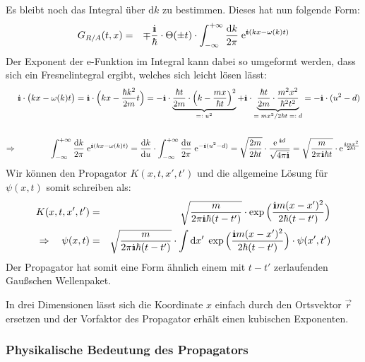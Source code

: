 Es bleibt noch das Integral über $\mathrm{d}k$ zu bestimmen. Dieses hat nun folgende Form: 
\begin{eqnarray*}
	G_{R/A}(t,x) &=& \mp \frac{\I}{\hbar}\cdot\Theta(\pm t)\cdot\int_{-\infty}^{+\infty}\frac{\mathrm{d}k}{2\pi}\; \e^{\I(kx-\omega(k)t)} 
\end{eqnarray*}
Der Exponent der e-Funktion im Integral kann dabei so umgeformt werden, dass sich ein Fresnelintegral ergibt, welches sich leicht lösen lässt: 
\begin{eqnarray} 
	&&\!\!\!\! \I\cdot\big(kx-\omega(k)t\big) = \I\cdot\Big(kx-\frac{\hbar k^2}{2m}t\Big) = -\I\cdot\underbrace{\frac{\hbar t}{2m}\cdot\Big(k-\frac{mx}{\hbar t}\Big)^2}_{=:\;u^2} +\I\cdot\underbrace{\frac{\hbar t}{2m}\cdot\frac{m^2x^2}{\hbar^2t^2}}_{=\; mx^2/2\hbar t\;=:\;d} = -\I\cdot(u^2-d) \nonumber
	\\\;\nonumber\\
	\Rightarrow&&\!\!\!\!\int_{-\infty}^{+\infty}\frac{\mathrm{d}k}{2\pi}\; \e^{\I(kx-\omega(k)t)} = \frac{\mathrm{d}k}{\mathrm{d}u}\cdot \int_{-\infty}^{+\infty} \frac{\mathrm{d}u}{2\pi}\;\e^{-\I(u^2-d)} = \sqrt{\frac{2m}{2\hbar t}}\cdot \frac{\e^{\;\I d}}{\sqrt{4\pi\I}} = \sqrt{\frac{m}{2\pi\I\hbar t}}\cdot\e^{\frac{\I mx^2}{2\hbar t}} \label{FresnelIntegral}
\end{eqnarray}
Wir können den Propagator $K(x,t,x',t')$ und die allgemeine Lösung für $\psi(x,t)$ somit schreiben als: 
\begin{eqnarray*}
	K(x,t,x',t') &=& \sqrt{\frac{m}{2\pi\I\hbar(t-t')}}\cdot\exp\Big(\frac{\I m(x-x')^2}{2\hbar (t-t')}\Big)
	\\
	\Rightarrow\quad \psi(x,t) &=& \sqrt{\frac{m}{2\pi\I\hbar(t-t')}}\cdot \int \mathrm{d}x'\; \exp\Big(\frac{\I m(x-x')^2}{2\hbar(t-t')}\Big)\cdot\psi(x',t')
\end{eqnarray*}
Der Propagator hat somit eine Form ähnlich einem mit $t-t'$ zerlaufenden Gaußschen Wellenpaket. 

In drei Dimensionen lässt sich die Koordinate $x$ einfach durch den Ortsvektor $\vec{r}$ ersetzen und der Vorfaktor des Propagator erhält einen kubischen Exponenten. 


\subsubsection{Physikalische Bedeutung des Propagators}

